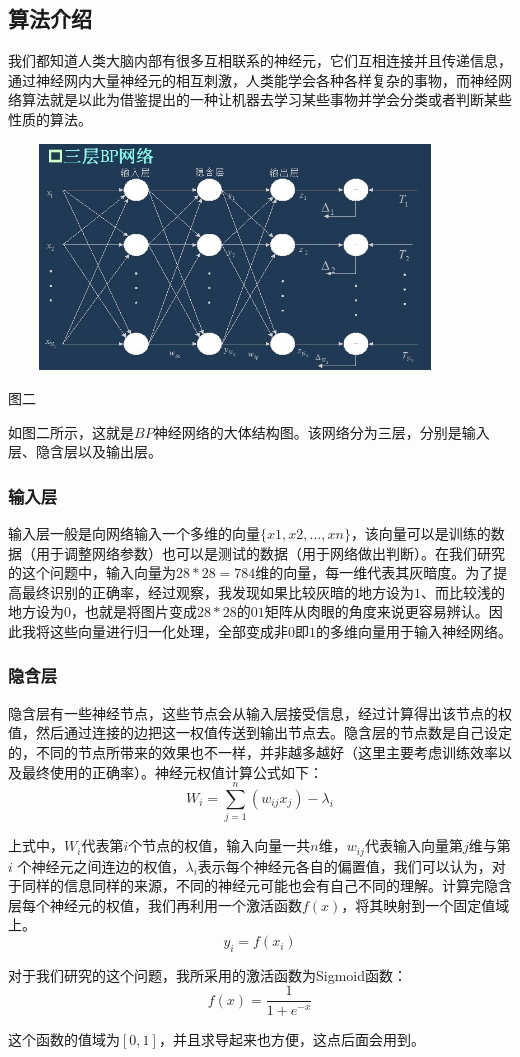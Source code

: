 ﻿\documentclass[UTF8]{ctexart}
\begin{document}
    \subsection{算法介绍}
我们都知道人类大脑内部有很多互相联系的神经元，它们互相连接并且传递信息，通过神经网内大量神经元的相互刺激，人类能学会各种各样复杂的事物，而神经网络算法就是以此为借鉴提出的一种让机器去学习某些事物并学会分类或者判断某些性质的算法。\\ \par
\centerline{\includegraphics[height=6cm,width=12cm]{p2.jpg}}
\begin{center} 图二 \end{center}\par
如图二所示，这就是$BP$神经网络的大体结构图。该网络分为三层，分别是输入层、隐含层以及输出层。\par
        \subsubsection{输入层}
输入层一般是向网络输入一个多维的向量$\{x1,x2,...,xn\}$，该向量可以是训练的数据（用于调整网络参数）也可以是测试的数据（用于网络做出判断）。在我们研究的这个问题中，输入向量为$28*28=784$维的向量，每一维代表其灰暗度。为了提高最终识别的正确率，经过观察，我发现如果比较灰暗的地方设为$1$、而比较浅的地方设为$0$，也就是将图片变成$28*28$的$01$矩阵从肉眼的角度来说更容易辨认。因此我将这些向量进行归一化处理，全部变成非$0$即$1$的多维向量用于输入神经网络。\par
        \subsubsection{隐含层}
隐含层有一些神经节点，这些节点会从输入层接受信息，经过计算得出该节点的权值，然后通过连接的边把这一权值传送到输出节点去。隐含层的节点数是自己设定的，不同的节点所带来的效果也不一样，并非越多越好（这里主要考虑训练效率以及最终使用的正确率）。神经元权值计算公式如下：
$$W_i = \sum _{j=1} ^n (w_{ij}x_j) - \lambda_i$$ \par
上式中，$W_i$代表第$i$个节点的权值，输入向量一共$n$维，$w_{ij}$代表输入向量第$j$维与第$i$ 个神经元之间连边的权值，$\lambda_i$表示每个神经元各自的偏置值，我们可以认为，对于同样的信息同样的来源，不同的神经元可能也会有自己不同的理解。计算完隐含层每个神经元的权值，我们再利用一个激活函数$f(x)$，将其映射到一个固定值域上。
$$y_i = f(x_i)$$ \par
对于我们研究的这个问题，我所采用的激活函数为Sigmoid函数：
$$f(x) = \frac{1}{1 + e^{-x}}$$ \par
这个函数的值域为$[0,1]$，并且求导起来也方便，这点后面会用到。\par
\end{document}
